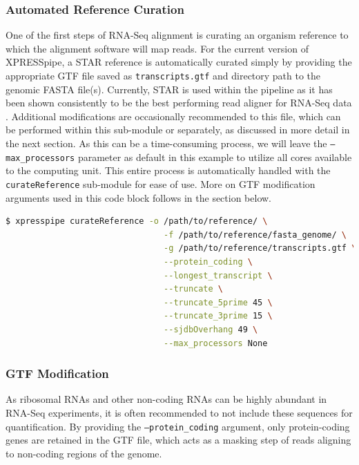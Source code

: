 \documentclass[10pt, oneside]{article}
\begin{document}
\subsubsection{Automated Reference Curation}
One of the first steps of RNA-Seq alignment is curating an organism reference to which the alignment software will map reads. For the current version of XPRESSpipe, a STAR \cite{star} reference is automatically curated simply by providing the appropriate GTF file saved as \texttt{transcripts.gtf} and directory path to the genomic FASTA file(s). Currently, STAR is used within the pipeline as it has been shown consistently to be the best performing read aligner for RNA-Seq data \cite{alignment_benchmark}. Additional modifications are occasionally recommended to this file, which can be performed within this sub-module or separately, as discussed in more detail in the next section. As this can be a time-consuming process, we will leave the \texttt{--max\_processors} parameter as default in this example to utilize all cores available to the computing unit. This entire process is automatically handled with the \texttt{curateReference} sub-module for ease of use. More on GTF modification arguments used in this code block follows in the section below.
\newline
\begin{lstlisting}[language=bash, caption=curateReference example]
$ xpresspipe curateReference -o /path/to/reference/ \
                                -f /path/to/reference/fasta_genome/ \
                                -g /path/to/reference/transcripts.gtf \
                                --protein_coding \
                                --longest_transcript \
                                --truncate \
                                --truncate_5prime 45 \
                                --truncate_3prime 15 \
                                --sjdbOverhang 49 \
                                --max_processors None
\end{lstlisting}


\subsubsection{GTF Modification}
As ribosomal RNAs and other non-coding RNAs can be highly abundant in RNA-Seq experiments, it is often recommended to not include these sequences for quantification. By providing the \texttt{--protein\_coding} argument, only protein-coding genes are retained in the GTF file, which acts as a masking step of reads aligning to non-coding regions of the genome. \par
\end{document}
